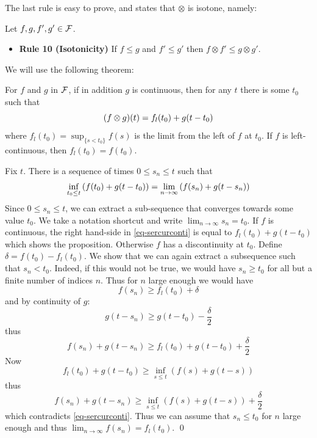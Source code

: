 The last rule is easy to prove, and states that $\otimes$ is
isotone, namely:
\begin{theorem}
Let $f, g, f', g' \in \mathcal F$.
\begin{itemize}
\item{\textbf{Rule 10 (Isotonicity)} If $f \leq g$ and $f' \leq g'$ then $f \otimes f' \leq  g \otimes g'$.}
\end{itemize}
\end{theorem}
We will use the following theorem:
\begin{theorem}
 For $f$ and $g$ in $\mathcal F$, if in
addition $g$ is continuous, then for any $t$ there is some $t_0$
such that
\begin{equation}\mylabel{eq-sercur-d2}
 (f \mpc g)(t)= f_l(t_{0}) + g(t-t_{0})
\end{equation}
where $f_l(t_0)= \sup_{\{s < t_0\}} f(s)$ is the limit from the left
of $f$ at $t_0$. If $f$ is left-continuous, then
$f_l(t_0)=f(t_0)$.
\end{theorem}
\pr
Fix $t$. There is a sequence of times $0 \leq s_n \leq t$ such
that
\begin{equation}\mylabel{eq-sercurconti}
  \inf_{t_0
\leq t} \left(f(t_{0})  + g(t-t_{0})\right) = \lim_{n \rightarrow
\infty} \left(f(s_{n})  + g(t-s_{n})\right)
\end{equation}
Since $0\leq s_n \leq t$, we can extract a sub-sequence that
converges towards some value $t_0$. We take a notation shortcut
and write $\lim_{n \rightarrow \infty} s_n=t_0$. If $f$ is
continuous, the right hand-side in \ref{eq-sercurconti} is equal
to $f_l(t_{0}) + g(t-t_{0})$ which shows the proposition.
Otherwise $f$ has a discontinuity at $t_0$. Define
$\delta=f(t_0)-f_l(t_0)$.  We show that we can again extract a
subsequence such that $s_n < t_0$. Indeed, if this would not be
true, we would have $s_n \geq t_0$ for all  but a finite number of
indices $n$. Thus for $n$ large enough we would have
 $$f(s_n)  \geq f_l(t_0)+ \delta $$
 and by
continuity of $g$:
$$
 g(t-s_n) \geq g(t-t_0) -\frac{\delta}{2}
 $$ thus
 $$
 f(s_n)+ g(t-s_{n}) \geq f_l(t_0)+ g(t-t_0) +\frac{\delta}{2}
 $$
 Now $$ f_l(t_0)+ g(t-t_0) \geq \inf_{s
\leq t} \left(f(s)  + g(t-s)\right)$$ thus
$$
 f(s_n)+ g(t-s_{n}) \geq \inf_{s
\leq t} \left(f(s)  + g(t-s)\right) +\frac{\delta}{2}
$$
 which contradicts \ref{eq-sercurconti}.
 Thus we can assume that $s_n \leq t_0$ for $n$ large enough and
 thus $\lim_{n
\rightarrow \infty} f(s_{n})= f_l(t_0)$. \qed

